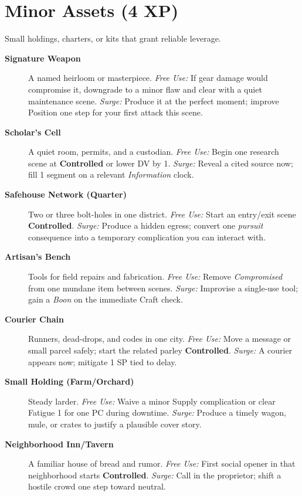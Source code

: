 \section{Minor Assets (4 XP)}
Small holdings, charters, or kits that grant reliable leverage.
\begin{description}
  \item[\textbf{Signature Weapon}]  A named heirloom or masterpiece. \emph{Free Use:} If gear damage would compromise it, downgrade to a minor flaw and clear with a quiet maintenance scene. \emph{Surge:} Produce it at the perfect moment; improve Position one step for your first attack this scene.
  \item[\textbf{Scholar’s Cell}]  A quiet room, permits, and a custodian. \emph{Free Use:} Begin one research scene at \textbf{Controlled} or lower DV by 1. \emph{Surge:} Reveal a cited source now; fill 1 segment on a relevant \emph{Information} clock.
  \item[\textbf{Safehouse Network (Quarter)}]  Two or three bolt-holes in one district. \emph{Free Use:} Start an entry/exit scene \textbf{Controlled}. \emph{Surge:} Produce a hidden egress; convert one \emph{pursuit} consequence into a temporary complication you can interact with.
  \item[\textbf{Artisan’s Bench}]  Tools for field repairs and fabrication. \emph{Free Use:} Remove \emph{Compromised} from one mundane item between scenes. \emph{Surge:} Improvise a single-use tool; gain a \emph{Boon} on the immediate Craft check.
  \item[\textbf{Courier Chain}]  Runners, dead-drops, and codes in one city. \emph{Free Use:} Move a message or small parcel safely; start the related parley \textbf{Controlled}. \emph{Surge:} A courier appears now; mitigate 1 SP tied to delay.
  \item[\textbf{Small Holding (Farm/Orchard)}]  Steady larder. \emph{Free Use:} Waive a minor Supply complication or clear Fatigue 1 for one PC during downtime. \emph{Surge:} Produce a timely wagon, mule, or crates to justify a plausible cover story.
  \item[\textbf{Neighborhood Inn/Tavern}]  A familiar house of bread and rumor. \emph{Free Use:} First social opener in that neighborhood starts \textbf{Controlled}. \emph{Surge:} Call in the proprietor; shift a hostile crowd one step toward neutral.

\end{description}

